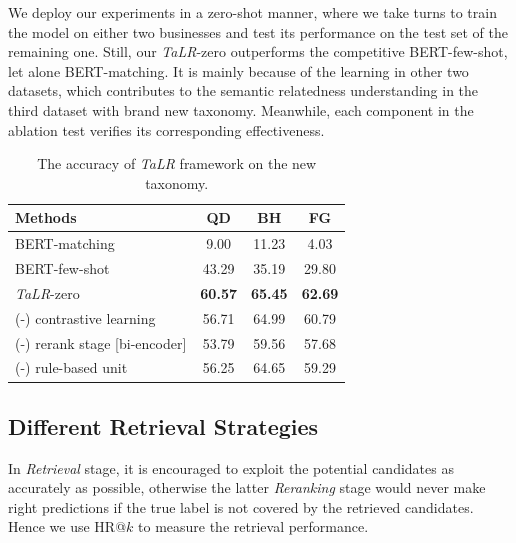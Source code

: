 We deploy our experiments in a zero-shot manner, where we take turns to train the model on either two businesses and test its performance on the test set of the remaining one. Still, our \textit{TaLR}-zero outperforms the competitive BERT-few-shot, let alone BERT-matching. 
It is mainly because of the learning in other two datasets, which contributes to the semantic relatedness understanding in the third dataset with brand new taxonomy. Meanwhile, each component in the ablation test verifies its corresponding effectiveness. 


\begin{table}[th]
  \begin{threeparttable}[b]
  \caption{The accuracy of \textit{TaLR} framework on the new taxonomy. }
  \label{tb:zeroshot}
  \centering
  \begin{tabular}{l|ccc}
    \toprule
    Methods & QD & BH & FG \\
    \midrule
    BERT-matching & 9.00 & 11.23 & 4.03 \\
    BERT-few-shot & 43.29 & 35.19 & 29.80 \\
    \midrule
    \textit{TaLR}-zero & \textbf{60.57} & \textbf{65.45} & \textbf{62.69}\\
    (-) contrastive learning & 56.71 & 64.99 & 60.79\\
    (-) rerank stage \tiny{[bi-encoder]} & 53.79 & 59.56 & 57.68 \\
    (-) rule-based unit & 56.25 & 64.65 & 59.29\\
    \bottomrule
  \end{tabular}
  \end{threeparttable}
\end{table}

\subsection{Different Retrieval Strategies}
\label{sec:retri stra}
In \textit{Retrieval} stage, it is encouraged to exploit the potential candidates as accurately as possible, otherwise the latter \textit{Reranking} stage would never make right predictions if the true label is not covered by the retrieved candidates. Hence we use HR@$k$ to measure the retrieval performance.

